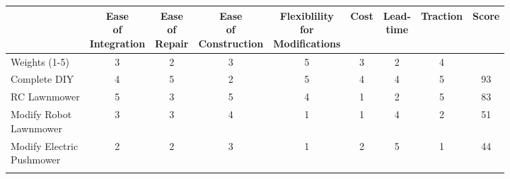 \documentclass{article}
\begin{document}
		\begin{table}[H]
		\begin{adjustwidth}{-1.5in}{-1.5in}
		\centering
		\setlength{\dashlinedash}{.4pt}
		\setlength\tabcolsep{4pt}


		\begin{tabular}{|l|c|c|c|c|c|c|c|c|}
		\hline
                                                               & \makecell{Ease \\ of \\ Integration} & \makecell{Ease \\ of \\ Repair} & \makecell{Ease \\ of \\ Construction} & \makecell{Flexiblility \\ for \\ Modifications} & Cost & \makecell{Lead- \\ time} & Traction & Score \\ \hline
		Weights (1-5)                                          & 3                   & 2              & 3                    & 5                              & 3    & 2        & 4        &       \\ \hline
		\multicolumn{1}{|l|}{\cellcolor{highlight}Complete DIY}& \multicolumn{1}{c|}{\cellcolor{highlight}4} & \multicolumn{1}{c|}{\cellcolor{highlight}5} & \multicolumn{1}{c|}{\cellcolor{highlight}2} & \multicolumn{1}{c|}{\cellcolor{highlight}5} & \multicolumn{1}{c|}{\cellcolor{highlight}4} & \multicolumn{1}{c|}{\cellcolor{highlight}4} & \multicolumn{1}{c|}{\cellcolor{highlight}5} & \multicolumn{1}{c|}{\cellcolor{highlight}93}    \\ \hdashline
		RC Lawnmower                                           & 5                   & 3              & 5                    & 4                              & 1    & 2        & 5        & 83    \\ \hdashline
		\makecell[l]{Modify Robot \\ Lawnmower}                & 3                   & 3              & 4                    & 1                              & 1    & 4        & 2        & 51    \\ \hdashline
		\makecell[l]{Modify Electric \\ Pushmower}             & 2                   & 2              & 3                    & 1                              & 2    & 5        & 1        & 44    \\ \hdashline

\end{tabular}
\end{adjustwidth}
\end{table}
\end{document}
